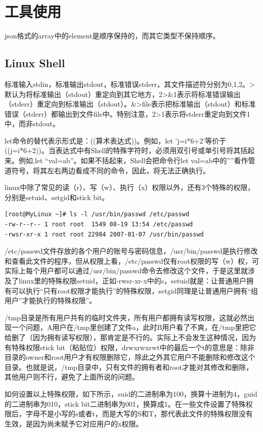 \section{工具使用}
\par json格式的array中的element是顺序保持的，而其它类型不保持顺序。
\subsection{Linux Shell}
\par 标准输入stdin，标准输出stdout，标准错误stderr，其文件描述符分别为0,1,2。>默认为将标准输出（stdout）重定向到其它地方，2>\&1表示将标准错误输出（stderr）重定向到标准输出（stdout）。\&>file表示把标准输出（stdout）和标准错误（stderr）都输出到文件file中。特别注意，2>1表示将stderr重定向到文件1中，而非stdout。
\par let命令的替代表示形式是：((算术表达式))。例如，let 'j=i*6+2'等价于((j=i*6+2))。当表达式中有Shell的特殊字符时，必须用双引号或单引号将其括起来。例如,let ``val=a\textbar b''。如果不括起来，Shell会把命令行let val=a\textbar b中的''\textbar''看作管道符号，将其左右两边看成不同的命令，因此，将无法正确执行。 
\par linux中除了常见的读（r）、写（w）、执行（x）权限以外，还有3个特殊的权限，分别是setuid、setgid和stick bit。
\begin{verbatim}
[root@MyLinux ~]# ls -l /usr/bin/passwd /etc/passwd
-rw-r--r-- 1 root root  1549 08-19 13:54 /etc/passwd
-rwsr-xr-x 1 root root 22984 2007-01-07 /usr/bin/passwd
\end{verbatim}
\par /etc/passwd文件存放的各个用户的账号与密码信息，/usr/bin/passwd是执行修改和查看此文件的程序，但从权限上看，/etc/passwd仅有root权限的写（w）权，可实际上每个用户都可以通过/usr/bin/passwd命令去修改这个文件，于是这里就涉及了linux里的特殊权限setuid，正如-rwsr-xr-x中的s，setuid就是：让普通用户拥有可以执行“只有root权限才能执行”的特殊权限，setgid同理是让普通用户拥有“组用户”才能执行的特殊权限”。
\par /tmp目录是所有用户共有的临时文件夹，所有用户都拥有读写权限，这就必然出现一个问题，A用户在/tmp里创建了文件a，此时B用户看了不爽，在/tmp里把它给删了（因为拥有读写权限），那肯定是不行的。实际上不会发生这种情况，因为有特殊权限stick bit（粘贴位）权限，drwxrwxrwt中的最后一个t的意思是：除非目录的owner和root用户才有权限删除它，除此之外其它用户不能删除和修改这个目录。也就是说，/tmp目录中，只有文件的拥有者和root才能对其修改和删除，其他用户则不行，避免了上面所说的问题。
\par 如何设置以上特殊权限，如下所示，suid的二进制串为100，换算十进制为4，guid的二进制串为010，stick bit二进制串为001，换算成1。在一些文件设置了特殊权限后，字母不是小写的s或者t，而是大写的S和T，那代表此文件的特殊权限没有生效，是因为尚未赋予它对应用户的x权限。\\
